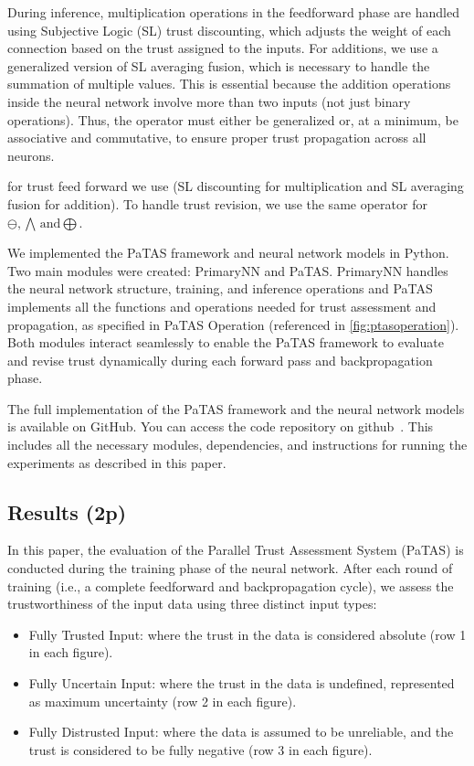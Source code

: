 During inference, multiplication operations in the feedforward phase are handled using Subjective Logic (SL) trust discounting, which adjusts the weight of each connection based on the trust assigned to the inputs. For additions, we use a generalized version of SL averaging fusion, which is necessary to handle the summation of multiple values. This is essential because the addition operations inside the neural network involve more than two inputs (not just binary operations). Thus, the operator must either be generalized or, at a minimum, be associative and commutative, to ensure proper trust propagation across all neurons.

for trust feed forward we use (SL discounting for multiplication and SL averaging fusion for addition).
To handle trust revision, we use the same operator for \(\ominus, \bigwedge\,\text{and} \bigoplus \). 

We implemented the PaTAS framework and neural network models in Python. Two main modules were created: PrimaryNN and PaTAS. PrimaryNN handles the neural network structure, training, and inference operations and PaTAS implements all the functions and operations needed for trust assessment and propagation, as specified in PaTAS Operation (referenced in \ref{fig:ptasoperation}).
Both modules interact seamlessly to enable the PaTAS framework to evaluate and revise trust dynamically during each forward pass and backpropagation phase.

The full implementation of the PaTAS framework and the neural network models is available on GitHub. You can access the code repository on github~\cite{code}. This includes all the necessary modules, dependencies, and instructions for running the experiments as described in this paper.


\subsection{Results (2p)}
In this paper, the evaluation of the Parallel Trust Assessment System (PaTAS) is conducted during the training phase of the neural network. After each round of training (i.e., a complete feedforward and backpropagation cycle), we assess the trustworthiness of the input data using three distinct input types:

\begin{itemize}
    \item Fully Trusted Input: where the trust in the data is considered absolute (row 1 in each figure).
    \item Fully Uncertain Input: where the trust in the data is undefined, represented as maximum uncertainty (row 2 in each figure).
    \item Fully Distrusted Input: where the data is assumed to be unreliable, and the trust is considered to be fully negative (row 3 in each figure).
\end{itemize}

